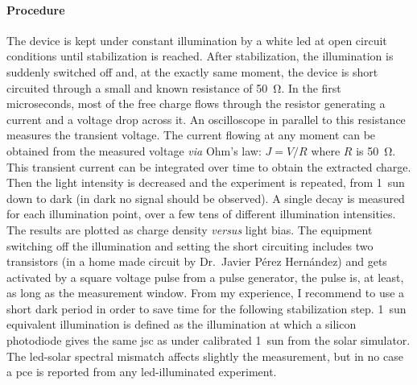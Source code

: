 \paragraph{Procedure}
The device is kept under constant illumination by a white \gls{led} at open circuit conditions until stabilization is reached.
After stabilization, the illumination is suddenly switched off and, at the exactly same moment, the device is short circuited through a small and known resistance of \SI{50}{\ohm}.
In the first microseconds, most of the free charge flows through the resistor generating a current and a voltage drop across it.
An oscilloscope in parallel to this resistance measures the transient voltage.
The current flowing at any moment can be obtained from the measured voltage \textsl{via} Ohm's law: $J=V/R$ where $R$ is \SI{50}{\ohm}.
This transient current can be integrated over time to obtain the extracted charge.
Then the light intensity is decreased and the experiment is repeated, from 1~sun down to dark (in dark no signal should be observed).
A single decay is measured for each illumination point, over a few tens of different illumination intensities.
The results are plotted as charge density \textsl{versus} light bias.
The equipment switching off the illumination and setting the short circuiting includes two transistors (in a home made circuit by Dr.\ Javier Pérez Hernández) and gets activated by a square voltage pulse from a pulse generator, the pulse is, at least, as long as the measurement window.
From my experience, I recommend to use a short dark period in order to save time for the following stabilization step.
1~sun equivalent illumination is defined as the illumination at which a silicon photodiode gives the same \gls{jsc} as under calibrated 1~sun from the solar simulator.
The \gls{led}-solar spectral mismatch affects slightly the measurement, but in no case a \gls{pce} is reported from any \gls{led}-illuminated experiment.

